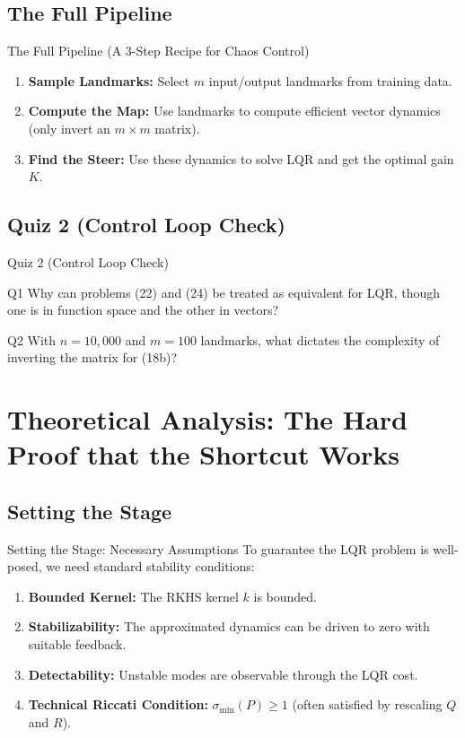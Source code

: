 \documentclass{beamer}
\begin{document}
\subsection{The Full Pipeline}
\begin{frame}{The Full Pipeline (A 3-Step Recipe for Chaos Control)}
\begin{enumerate}
  \item \textbf{Sample Landmarks:} Select $m$ input/output landmarks from training data.
  \item \textbf{Compute the Map:} Use landmarks to compute efficient vector dynamics (only invert an $m\times m$ matrix).
  \item \textbf{Find the Steer:} Use these dynamics to solve LQR and get the optimal gain $K$.
\end{enumerate}
\end{frame}

\subsection{Quiz 2 (Control Loop Check)}
\begin{frame}{Quiz 2 (Control Loop Check)}
\begin{block}{Q1}
Why can problems (22) and (24) be treated as equivalent for LQR, though one is in function space and the other in vectors?
\end{block}
\begin{block}{Q2}
With $n=10{,}000$ and $m=100$ landmarks, what dictates the complexity of inverting the matrix for (18b)?
\end{block}
\end{frame}

\section{Theoretical Analysis: The Hard Proof that the Shortcut Works}

\subsection{Setting the Stage}
\begin{frame}{Setting the Stage: Necessary Assumptions}
To guarantee the LQR problem is well-posed, we need standard stability conditions:
\begin{enumerate}
  \item \textbf{Bounded Kernel:} The RKHS kernel $k$ is bounded.
  \item \textbf{Stabilizability:} The approximated dynamics can be driven to zero with suitable feedback.
  \item \textbf{Detectability:} Unstable modes are observable through the LQR cost.
  \item \textbf{Technical Riccati Condition:} $\sigma_{\min}(P)\ge 1$ (often satisfied by rescaling $Q$ and $R$).
\end{enumerate}
\end{frame}
\end{document}

